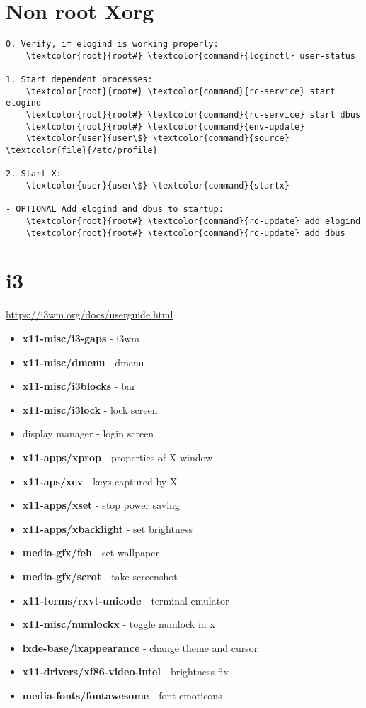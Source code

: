 \documentclass[10pt, a4paper, onecolumn, openany]{book}         %
\begin{document}
\section{Non root Xorg}
\begin{Verbatim}[commandchars=\\\{\}]
0. Verify, if elogind is working properly:
    \textcolor{root}{root#} \textcolor{command}{loginctl} user-status

1. Start dependent processes:
    \textcolor{root}{root#} \textcolor{command}{rc-service} start elogind
    \textcolor{root}{root#} \textcolor{command}{rc-service} start dbus
    \textcolor{root}{root#} \textcolor{command}{env-update}
    \textcolor{user}{user\$} \textcolor{command}{source} \textcolor{file}{/etc/profile}

2. Start X:
    \textcolor{user}{user\$} \textcolor{command}{startx}

- OPTIONAL Add elogind and dbus to startup:
    \textcolor{root}{root#} \textcolor{command}{rc-update} add elogind
    \textcolor{root}{root#} \textcolor{command}{rc-update} add dbus
\end{Verbatim}


\newpage
\section{i3}
\underline{\url{https://i3wm.org/docs/userguide.html}}\newline
\begin{itemize}
    \item \textbf{x11-misc/i3-gaps}     - i3wm
    \item \textbf{x11-misc/dmenu}       - dmenu
    \item \textbf{x11-misc/i3blocks}    - bar
    \item \textbf{x11-misc/i3lock}      - lock screen
    \item display manager - login screen
    \item \textbf{x11-apps/xprop}       - properties of X window
    \item \textbf{x11-aps/xev}          - keys captured by X
    \item \textbf{x11-apps/xset}        - stop power saving
    \item \textbf{x11-apps/xbacklight}  - set brightness
    \item \textbf{media-gfx/feh}        - set wallpaper
    \item \textbf{media-gfx/scrot}      - take screenshot
    \item \textbf{x11-terms/rxvt-unicode} - terminal emulator
    \item \textbf{x11-misc/numlockx} - toggle numlock in x
    \item \textbf{lxde-base/lxappearance} - change theme and cursor
    \item \textbf{x11-drivers/xf86-video-intel} - brightness fix
    \item \textbf{media-fonts/fontawesome} - font emoticons
\end{itemize}
\end{document}
